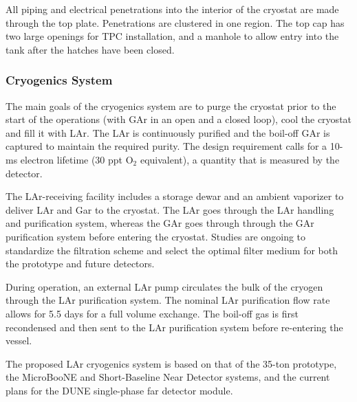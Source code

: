 All piping and electrical penetrations into the interior of the cryostat are made through the top plate.
Penetrations are clustered in one region.
The top cap has two large openings for TPC installation, and a manhole to allow entry into the tank  after the
hatches have been closed.

\subsubsection{Cryogenics System}

The main goals of the %
cryogenics system are to purge the cryostat prior to the start of the operations (with GAr in an open
and a closed loop), cool the cryostat and fill it with LAr. %
The LAr is continuously purified
and the boil-off GAr is captured  to maintain the required purity.
  The design requirement calls for a 10-ms electron lifetime (30 ppt O$_2$ equivalent), a quantity that is measured by the detector.

The LAr-receiving facility includes a storage dewar and an ambient vaporizer to deliver LAr and Gar to the
cryostat. The LAr goes through the LAr handling and purification system, whereas the GAr goes through
through the GAr purification system before entering the cryostat.
Studies are ongoing to standardize the filtration scheme and select the optimal filter medium for %
both the prototype and future %
detectors. %

During operation, an external LAr pump circulates the bulk of the cryogen through the LAr purification
system. The nominal LAr purification flow rate allows for 5.5 days for a full volume exchange.
The boil-off gas is first recondensed and then sent to the LAr purification system before
re-entering the vessel.

The proposed LAr cryogenics system is based on that of the 35-ton prototype, the MicroBooNE and Short-Baseline Near Detector systems, and the current plans for the DUNE single-phase far detector module.










